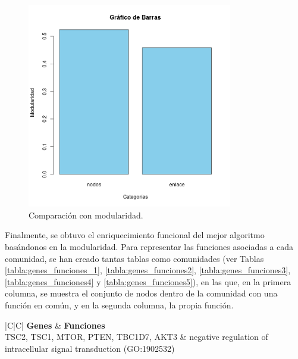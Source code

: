 \begin{figure}
  \centering
  \includegraphics[width=0.8\textwidth]{figures/comparacion_grafos.png}
  \caption{Comparación con modularidad.}
  \label{fig:comparacion_grafos}
\end{figure}

Finalmente, se obtuvo el enriquecimiento funcional del mejor algoritmo basándonos en la modularidad. Para representar las funciones asociadas a cada comunidad, se han creado tantas tablas como comunidades (ver Tablas \ref{tabla:genes_funciones_1}, \ref{tabla:genes_funciones2},  \ref{tabla:genes_funciones3}, \ref{tabla:genes_funciones4} y \ref{tabla:genes_funciones5}), en las que, en la primera columna, se muestra el conjunto de nodos dentro de la comunidad con una función en común, y en la segunda columna, la propia función.

\begin{table}[!]
 	\caption{Descripción de Genes y Funciones de la comunidad 1}
	\centering
	\begin{tabular}{|C|C|}
    \toprule
    \textbf{Genes} & \textbf{Funciones} \\
    \midrule
    TSC2, TSC1, MTOR, PTEN, TBC1D7, AKT3 & negative regulation of intracellular signal transduction (GO:1902532) \\
    \bottomrule
    \label{tabla:genes_funciones_1}
 	\end{tabular}
\end{table}

